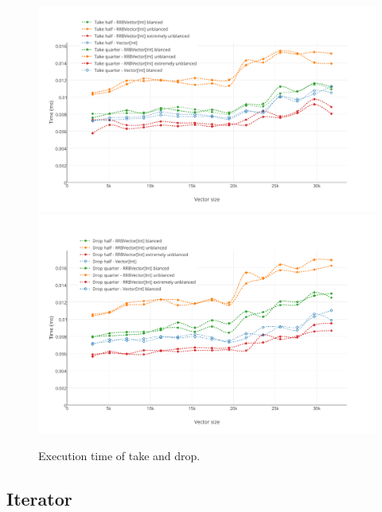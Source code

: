 \begin{figure}[h!]
  \centering
  \includegraphics[width=\textwidth]{Benchmarks/Split_take_3.pdf}
  \includegraphics[width=\textwidth]{Benchmarks/Split_drop_3.pdf}
  \label{SplitsBenchmarks}
  \caption{Execution time of take and drop.}
\end{figure}


\subsection{Iterator}

